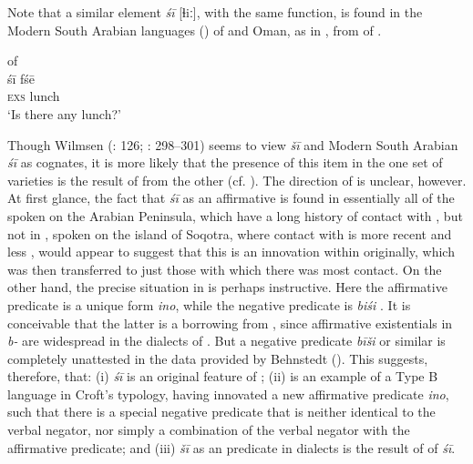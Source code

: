 \documentclass[output=paper]{langsci/langscibook}
\begin{document}
Note that a similar element \textit{śī} [ɬiː], with the same  function, is found in the Modern {South Arabian} languages () of  and {Oman}, as in , from  of .

\ea\label{meh}
{        of  \citep[31]{Watson2011SAYemeni}}\\
\gll śī fśē \\
     \textsc{exs} lunch\\
\glt ‘Is there any lunch?’
\z

Though Wilmsen (\citeyear{Wilmsen2014}: 126; \citeyear{Wilmsen2017}: 298--301) seems to view  \textit{šī} and Modern {South Arabian} \textit{śī} as cognates, it is more likely that the presence of this item in the one set of varieties is the result of  from the other (cf. \citealt{Al-Jallad2015review}). The direction of  is unclear, however. At first glance, the fact that \textit{śī} as an affirmative  is found in essentially all of the  spoken on the Arabian Peninsula, which have a long history of  contact with , but not in , spoken on the island of Soqotra, where contact with  is more recent and less  \citep{Simeone-Senelle2003}, would appear to suggest that this is an innovation within  originally, which was then transferred to just those  with which there was most contact. On the other hand, the precise situation in  is perhaps instructive. Here the affirmative  predicate is a unique form \textit{ino}, while the negative  predicate is \textit{biśi} \citep[1108]{Simeone-Senelle2011}. It is conceivable that the latter is a borrowing from , since affirmative existentials in \textit{b-} are widespread in the  dialects of . But a negative  predicate \textit{bīši} or similar is completely unattested in the  data provided by Behnstedt (\citeyear[346–348]{Behnstedt2016Yemen}). This suggests, therefore, that: (i)  \textit{śī} is an original feature of ; (ii)  is an example of a Type B language in Croft’s typology, having innovated a new affirmative  predicate \textit{ino}, such that there is a special negative  predicate that is neither identical to the verbal negator, nor simply a combination of the verbal negator with the affirmative  predicate; and (iii) \textit{šī} as an  predicate in  dialects is the result of  of  \textit{śī}.
\end{document}
